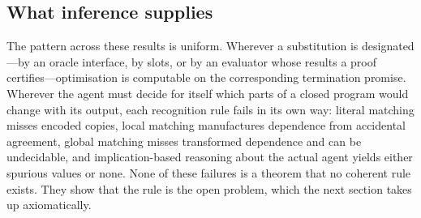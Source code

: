 \subsection{What inference supplies}

The pattern across these results is uniform. Wherever a substitution is designated---by an oracle
interface, by slots, or by an evaluator whose results a proof certifies---optimisation is
computable on the corresponding termination promise. Wherever the agent must decide for itself
which parts of a closed program would change with its output, each recognition rule fails in its
own way: literal matching misses encoded copies, local matching manufactures dependence from
accidental agreement, global matching misses transformed dependence and can be undecidable, and
implication-based reasoning about the actual agent yields either spurious values or none. None of
these failures is a theorem that no coherent rule exists. They show that the rule is the open
problem, which the next section takes up axiomatically.
